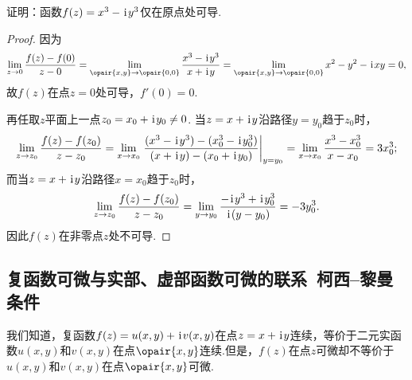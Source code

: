 \begin{example}
证明：函数\(f(z) = x^3 - \kern1pt\mathrm{i}\kern1pt y^3\)仅在原点处可导.
\begin{proof}
因为\[
\lim\limits_{z\to0} \frac{f(z) - f(0)}{z - 0}
= \lim\limits_{\opair{x,y}\to\opair{0,0}} \frac{x^3 - \iu y^3}{x + \iu y}
= \lim\limits_{\opair{x,y}\to\opair{0,0}} x^2 - y^2 - \iu xy
= 0,
\]故\(f(z)\)在点\(z = 0\)处可导，\(f'(0) = 0\).

再任取\(z\)平面上一点\(z_0 = x_0 + \kern1pt\mathrm{i}\kern1pt y_0 \neq 0\).
当\(z = x + \kern1pt\mathrm{i}\kern1pt y\)沿路径\(y = y_0\)趋于\(z_0\)时，\[
\lim\limits_{z \to z_0} \frac{f(z) - f(z_0)}{z - z_0}
= \lim\limits_{x \to x_0} \eval{\frac{(x^3 - \iu y^3) - (x_0^3 - \iu y_0^3)}{(x + \iu y) - (x_0 + \iu y_0)}}_{y = y_0}
= \lim\limits_{x \to x_0} \frac{x^3 - x_0^3}{x - x_0}
= 3 x_0^3;
\]而当\(z = x + \kern1pt\mathrm{i}\kern1pt y\)沿路径\(x = x_0\)趋于\(z_0\)时，\[
\lim\limits_{z \to z_0} \frac{f(z) - f(z_0)}{z - z_0}
= \lim\limits_{y \to y_0} \frac{-\kern1pt\mathrm{i}\kern1pt y^3 + \kern1pt\mathrm{i}\kern1pt y_0^3}{\kern1pt\mathrm{i}\kern1pt (y - y_0)}
= -3 y_0^3.
\]因此\(f(z)\)在非零点\(z\)处不可导.
\end{proof}
\end{example}

\subsection{复函数可微与实部、虚部函数可微的联系\ 柯西--黎曼条件}
我们知道，复函数\(f(z)=u(x,y)+\kern1pt\mathrm{i}\kern1pt v(x,y)\)在点\(z=x+\kern1pt\mathrm{i}\kern1pt y\)连续，等价于二元实函数\(u(x,y)\)和\(v(x,y)\)在点\(\opair{x,y}\)连续.但是，\(f(z)\)在点\(z\)可微却不等价于\(u(x,y)\)和\(v(x,y)\)在点\(\opair{x,y}\)可微.

